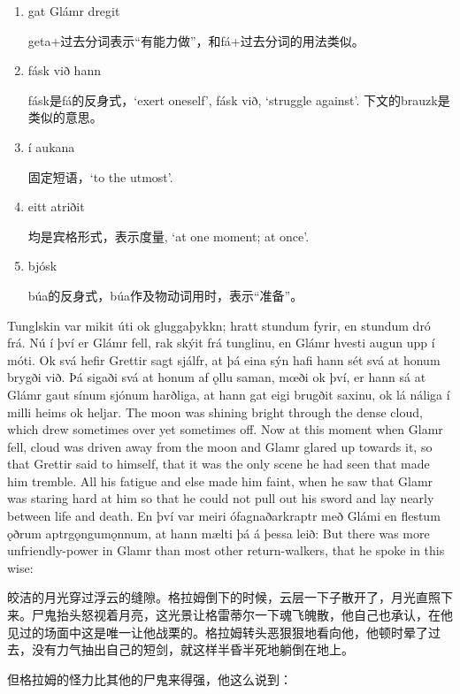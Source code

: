 \begin{grammar*}{}
    \begin{enumerate}[leftmargin=*]
        \item gat Glámr dregit

              geta+过去分词表示“有能力做”，和fá+过去分词的用法类似。

        \item fásk við hann

              fásk是fá的反身式，`exert oneself', fásk við, `struggle against'. 下文的brauzk是类似的意思。

        \item í aukana

              固定短语，`to the utmost'.

        \item eitt atriðit

              均是宾格形式，表示度量, `at one moment; at once'.

        \item bjósk

              búa的反身式，búa作及物动词用时，表示“准备”。
    \end{enumerate}
\end{grammar*}
\begin{paracol}{2}
    Tunglskin var mikit úti ok gluggaþykkn; hratt stundum fyrir, en stundum dró frá. Nú í því er Glámr fell, rak skýit frá tunglinu, en Glámr hvesti augun upp í móti. Ok svá hefir Grettir sagt sjálfr, at þá eina sýn hafi hann sét svá at honum brygði við. Þá sigaði svá at honum af ǫllu saman, mœði ok því, er hann sá at Glámr gaut sínum sjónum harðliga, at hann gat eigi brugðit saxinu, ok lá náliga í milli heims ok heljar.
    \switchcolumn
    The moon was shining bright through the dense cloud, which drew sometimes over yet sometimes off. Now at this moment when Glamr fell, cloud was driven away from the moon and Glamr glared up towards it, so that Grettir said to himself, that it was the only scene he had seen that made him tremble. All his fatigue and else made him faint, when he saw that Glamr was staring hard at him so that he could not pull out his sword and lay nearly between life and death.
    \switchcolumn
    En því var meiri ófagnaðarkraptr með Glámi en flestum ǫðrum aptrgǫngumǫnnum, at hann mælti þá á þessa leið:
    \switchcolumn
    But there was more unfriendly-power in Glamr than most other return-walkers, that he spoke in this wise:
\end{paracol}
\begin{translation*}{}
    皎洁的月光穿过浮云的缝隙。格拉姆倒下的时候，云层一下子散开了，月光直照下来。尸鬼抬头怒视着月亮，这光景让格雷蒂尔一下魂飞魄散，他自己也承认，在他见过的场面中这是唯一让他战栗的。格拉姆转头恶狠狠地看向他，他顿时晕了过去，没有力气抽出自己的短剑，就这样半昏半死地躺倒在地上。

    但格拉姆的怪力比其他的尸鬼来得强，他这么说到：
\end{translation*}
